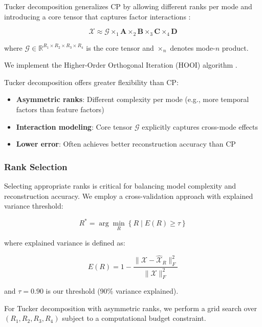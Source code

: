 \documentclass{article}
\begin{document}
Tucker decomposition generalizes CP by allowing different ranks per mode and introducing a core tensor that captures factor interactions \citep{Tucker1966Some}:

\begin{equation}
\mathcal{X} \approx \mathcal{G} \times_1 \mathbf{A} \times_2 \mathbf{B} \times_3 \mathbf{C} \times_4 \mathbf{D}
\label{eq:tucker}
\end{equation}

where $\mathcal{G} \in \mathbb{R}^{R_1 \times R_2 \times R_3 \times R_4}$ is the core tensor and $\times_n$ denotes mode-$n$ product.

We implement the Higher-Order Orthogonal Iteration (HOOI) algorithm \citep{DeLathauwer2000Multilinear}.

Tucker decomposition offers greater flexibility than CP:

\begin{itemize}[leftmargin=*]
    \item \textbf{Asymmetric ranks}: Different complexity per mode (e.g., more temporal factors than feature factors)
    \item \textbf{Interaction modeling}: Core tensor $\mathcal{G}$ explicitly captures cross-mode effects
    \item \textbf{Lower error}: Often achieves better reconstruction accuracy than CP
\end{itemize}

\subsubsection{Rank Selection}

Selecting appropriate ranks is critical for balancing model complexity and reconstruction accuracy. We employ a cross-validation approach with explained variance threshold:

\begin{equation}
R^* = \arg\min_{R} \left\{ R \mid E(R) \geq \tau \right\}
\label{eq:rank-selection}
\end{equation}

where explained variance is defined as:

$$E(R) = 1 - \frac{\|\mathcal{X} - \hat{\mathcal{X}}_R\|_F^2}{\|\mathcal{X}\|_F^2}$$

and $\tau = 0.90$ is our threshold (90\% variance explained).

For Tucker decomposition with asymmetric ranks, we perform a grid search over $(R_1, R_2, R_3, R_4)$ subject to a computational budget constraint.
\end{document}
